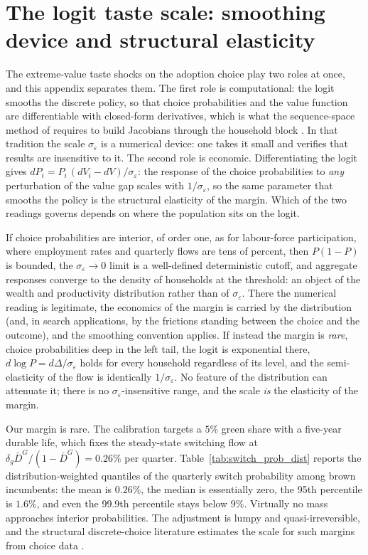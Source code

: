 \section{The logit taste scale: smoothing device and structural elasticity}
\label{app:taste}

The extreme-value taste shocks on the adoption choice play two roles at once, and
this appendix separates them. The first role is computational: the logit smooths
the discrete policy, so that choice probabilities and the value function are
differentiable with closed-form derivatives, which is what the sequence-space
method of \citet{Auclert2021a} requires to build Jacobians through the household
block \citep{iskhakov2017endogenous}. In that tradition the scale $\sigma_\varepsilon$ is a
numerical device: one takes it small and verifies that results are insensitive to
it. The second role is economic. Differentiating the logit gives
$dP_i = P_i\,(dV_i - dV)/\sigma_\varepsilon$: the response of the choice
probabilities to \emph{any} perturbation of the value gap scales with
$1/\sigma_\varepsilon$, so the same parameter that smooths the policy is the
structural elasticity of the margin. Which of the two readings governs depends on where the population sits on the
logit.

If choice probabilities are interior, of order one, as for labour-force
participation, where employment rates and quarterly flows are tens of
percent, then $P(1-P)$ is bounded, the $\sigma_\varepsilon \to 0$ limit is a
well-defined deterministic cutoff, and aggregate responses converge to the
density of households at the threshold: an object of the wealth and productivity
distribution rather than of $\sigma_\varepsilon$. There the numerical reading is
legitimate, the economics of the margin is carried by the distribution (and, in
search applications, by the frictions standing between the choice and the
outcome), and the smoothing convention applies. If instead the margin is
\emph{rare}, choice probabilities deep in the left tail, the logit is
exponential there, $d\log P = d\Delta/\sigma_\varepsilon$ holds for every
household regardless of its level, and the semi-elasticity of the flow is
identically $1/\sigma_\varepsilon$. No feature of the distribution can attenuate
it; there is no $\sigma_\varepsilon$-insensitive range, and the scale \emph{is}
the elasticity of the margin.

Our margin is rare. The calibration targets a $5\%$ green share
with a five-year durable life, which fixes the steady-state switching flow at
$\delta_g \bar D^{G}/(1-\bar D^{G}) = 0.26\%$ per quarter.
Table~\ref{tab:switch_prob_dist} reports the distribution-weighted quantiles of
the quarterly switch probability among brown incumbents: the mean is $0.26\%$,
the median is essentially zero, the 95th percentile is $1.6\%$, and even the
99.9th percentile stays below $9\%$. Virtually no mass approaches interior
probabilities. The adjustment is lumpy and quasi-irreversible, and the structural
discrete-choice literature estimates the scale for such margins from choice data
\citep{Rust1987}.

